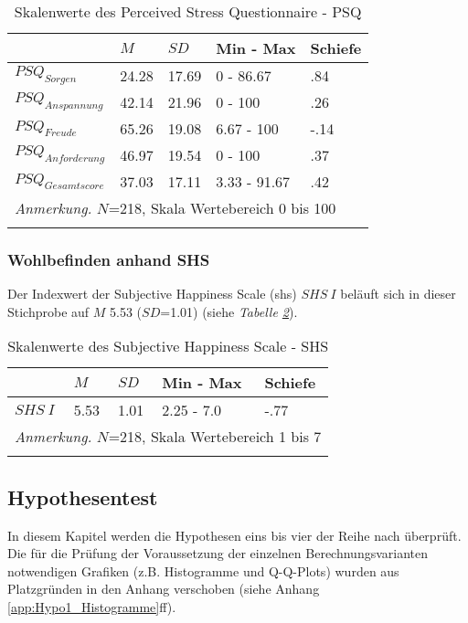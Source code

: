 \begin{table}[ht]
\begin{tabular}{m{6em} m{3em}  m{3em}  m{5em} m{3em}} 
  \hline
  & $M$ & $SD$ & Min - Max & Schiefe\\
  \hline
  $PSQ_{Sorgen}$ & 24.28 & 17.69 & 0 - 86.67 & .84 \\
  $PSQ_{Anspannung}$ & 42.14 & 21.96 & 0 - 100 & .26\\
  $PSQ_{Freude}$ & 65.26 & 19.08 & 6.67 - 100 & -.14\\
  $PSQ_{Anforderung}$ & 46.97 & 19.54 & 0 - 100 & .37 \\
  $PSQ_{Gesamtscore}$ & 37.03 & 17.11 & 3.33 - 91.67 & .42\\
  \hline
  \multicolumn{5}{l}{\textit{Anmerkung.} $N$=218, Skala Wertebereich 0 bis 100}\\
  &&&&\\
\end{tabular}
\caption{Skalenwerte des Perceived Stress Questionnaire - PSQ}
\label{table:PSQDeskriptiv}
\end{table}


\subsubsection{Wohlbefinden anhand SHS}
Der Indexwert der Subjective Happiness Scale (\acrshort{shs}) $SHS~I$ beläuft sich in dieser Stichprobe auf $M$ 5.53 ($SD$=1.01) (siehe \textit{Tabelle \ref{table:SHSDeskriptiv}}).

\begin{table}[ht]
\begin{tabular}{m{6em} m{3em}  m{3em}  m{5em} m{3em}} 
  \hline
  & $M$ & $SD$ & Min - Max & Schiefe\\
  \hline
  $SHS~I$ & 5.53 & 1.01 & 2.25 - 7.0 & -.77 \\
  \hline
  \multicolumn{5}{l}{\textit{Anmerkung.} $N$=218, Skala Wertebereich 1 bis 7}\\
  &&&&\\
\end{tabular}
\caption{Skalenwerte des Subjective Happiness Scale - SHS}
\label{table:SHSDeskriptiv}
\end{table}

\subsection{Hypothesentest} \label{sec:Hypothesentest}
In diesem Kapitel werden die Hypothesen eins bis vier der Reihe nach überprüft. Die für die Prüfung der Voraussetzung der einzelnen Berechnungsvarianten notwendigen Grafiken (z.B. Histogramme und Q-Q-Plots) wurden aus Platzgründen in den Anhang verschoben (siehe Anhang \ref{app:Hypo1_Histogramme}ff).

